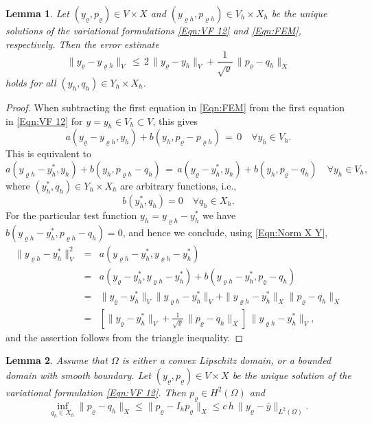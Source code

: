 \documentclass{article}
\newcommand{\norm}[1]{\|#1\|}
\newtheorem{lemma}{Lemma}
\numberwithin{equation}{section}
\begin{document}
\begin{lemma}
  Let $(y_\varrho,p_\varrho) \in V \times X$ and
  $(y_{\varrho h},p_{\varrho h}) \in V_h \times X_h$ be the unique
  solutions of the variational formulations \eqref{Eqn:VF 12} and
  \eqref{Eqn:FEM}, respectively. Then 
  the error estimate
  \begin{equation}\label{Eqn:Cea}
    \| y_\varrho -y_{\varrho h}\|_V
    \, \leq \, 2 \,
    \| y_\varrho-y_h\|_V  +
    \frac{1}{\sqrt{\varrho}} \, \| p_\varrho-q_h \|_X
  \end{equation}
  holds for all $(y_h,q_h) \in Y_h \times X_h$.
\end{lemma}

\begin{proof}
  When subtracting the first equation in \eqref{Eqn:FEM} from the first
  equation in \eqref{Eqn:VF 12} for $y=y_h \in V_h \subset V$, this gives
  \[
    a(y_\varrho-y_{\varrho h},y_h) + b(y_h,p_\varrho-p_{\varrho h}) \, = \, 0
    \quad \forall y_h \in V_h .
  \]
   This is equivalent to
   \[
     a(y_{\varrho h}-y_h^*,y_h) + b(y_h,p_{\varrho h}-q_h) 
     \, = \,
     a(y_\varrho-y_h^*,y_h) + b(y_h,p_\varrho-q_h) \quad \forall y_h \in V_h,
   \]
   where $(y_h^*,q_h) \in Y_h \times X_h$ are arbitrary functions, i.e.,
   \[
     b(y_h^*,q_h) = 0 \quad \forall q_h \in X_h .
   \]
   For the particular test function $y_h = y_{\varrho h} - y_h^*$ we have
   $b(y_{\varrho h}-y_h^*,p_{\varrho h}-q_h) = 0$, and hence we conclude,
   using \eqref{Eqn:Norm X Y},
   \begin{eqnarray*}
     \| y_{\varrho h} - y_h^* \|_V^2
     & = & a(y_{\varrho h} - y_h^*,y_{\varrho h} - y_h^*) \\
     & = & a(y_\varrho-y_h^*,y_{\varrho h}-y_h^*) +
           b(y_{\varrho h}-y_h^*,p_\varrho-q_h) \\
     & = & \| y_\varrho-y_h^*\|_V \| y_{\varrho h}-y_h^*\|_V +
           \| y_{\varrho h}-y_h^* \|_X \| p_\varrho-q_h \|_X \\
     & = & \left[ \| y_\varrho-y_h^*\|_V  +
           \frac{1}{\sqrt{\varrho}} \, \| p_\varrho-q_h \|_X
           \right] \, \| y_{\varrho h}-y_h^*\|_V,
   \end{eqnarray*}
  and the assertion follows from the triangle inequality.
\end{proof}

\begin{lemma}
  Assume that $\Omega$ is either a convex Lipschitz domain, or a bounded
  domain with smooth boundary.
  Let $(y_\varrho,p_\varrho) \in V \times X$ be the unique solution of the
  variational formulation \eqref{Eqn:VF 12}. Then $p_\varrho\in H^2(\Omega)$ and
  \begin{equation}\label{Eqn:Error p}
    \inf_{q_h\in X_h}\| p_\varrho - q_h \|_X \leq \norm{p_\varrho-I_h p_\varrho}_X\leq 
    c \, h \, \| y_\varrho - \overline{y} \|_{L^2(\Omega)} .
  \end{equation}
\end{lemma}
\end{document}
